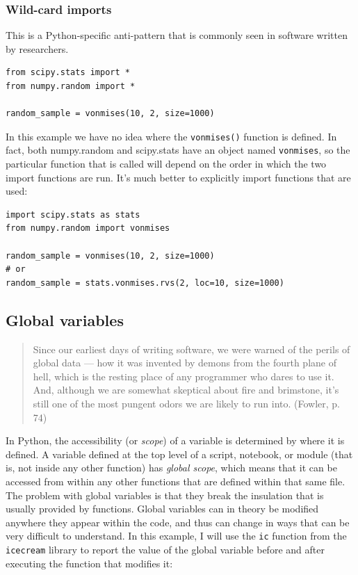 \subsubsection{Wild-card imports}

This is a Python-specific anti-pattern that is commonly seen in software written by researchers.

\begin{lstlisting}[style=Python]
from scipy.stats import *
from numpy.random import *

random_sample = vonmises(10, 2, size=1000)
\end{lstlisting}

In this example we have no idea where the \texttt{vonmises()} function is defined.
In fact, both numpy.random and scipy.stats have an object named \texttt{vonmises}, so the particular function that is called will depend on the order in which the two import functions are run.
It's much better to explicitly import functions that are used:

\begin{lstlisting}[style=Python]
import scipy.stats as stats
from numpy.random import vonmises

random_sample = vonmises(10, 2, size=1000)
# or
random_sample = stats.vonmises.rvs(2, loc=10, size=1000)
\end{lstlisting}

\subsection{Global variables}

\begin{quote}
Since our earliest days of writing software, we were warned of the perils of global data --- how it was invented by demons from the fourth plane of hell, which is the resting place of any programmer who dares to use it.
And, although we are somewhat skeptical about fire and brimstone, it's still one of the most pungent odors we are likely to run into. (Fowler, p. 74)
\end{quote}

In Python, the accessibility (or \textit{scope}) of a variable is determined by where it is defined.
A variable defined at the top level of a script, notebook, or module (that is, not inside any other function) has \textit{global scope}, which means that it can be accessed from within any other functions that are defined within that same file.
The problem with global variables is that they break the insulation that is usually provided by functions.
Global variables can in theory be modified anywhere they appear within the code, and thus can change in ways that can be very difficult to understand.
In this example, I will use the \texttt{ic} function from the \texttt{icecream} library to report the value of the global variable before and after executing the function that modifies it:

